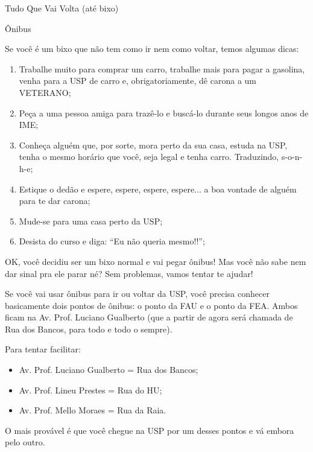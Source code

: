 \begin{secao}{Tudo Que Vai Volta (até bixo)}

\begin{subsecao}{Ônibus}

Se você é um bixo que não tem como ir nem como voltar, temos algumas dicas:

\begin{enumerate}
  \item Trabalhe muito para comprar um carro,
  trabalhe mais para pagar a gasolina,
  venha para a USP de carro e, obrigatoriamente, dê carona a um VETERANO;

  \item Peça a uma pessoa amiga para trazê-lo e buscá-lo durante seus
  longos anos de IME;

  \item Conheça alguém que, por sorte, mora perto da sua casa, estuda na USP,
  tenha o mesmo horário que você, seja legal e tenha carro. Traduzindo, s-o-n-h-e;

  \item Estique o dedão e espere, espere, espere, espere... a boa vontade
  de alguém para te dar carona;

  \item Mude-se para uma casa perto da USP;

  \item Desista do curso e diga: ``Eu não queria mesmo!!'';
\end{enumerate}

OK, você decidiu ser um bixo normal e vai pegar ônibus! Mas você não sabe nem 
dar sinal pra ele parar né? Sem problemas, vamos tentar te ajudar!

Se você vai usar ônibus para ir ou voltar da USP, você precisa conhecer
basicamente dois pontos de ônibus: o ponto da FAU e o ponto da
FEA. Ambos ficam na Av. Prof. Luciano Gualberto (que a partir de agora será
chamada de Rua dos Bancos, para todo e todo o sempre).

Para tentar facilitar:
\begin{itemize}
	\item Av. Prof. Luciano Gualberto = Rua dos Bancos;
	\item Av. Prof. Lineu Prestes = Rua do HU;
	\item Av. Prof. Mello Moraes = Rua da Raia.
\end{itemize}

O mais provável é que você chegue na USP por um desses
pontos e vá embora pelo outro. 


\end{subsecao}
\end{secao}
